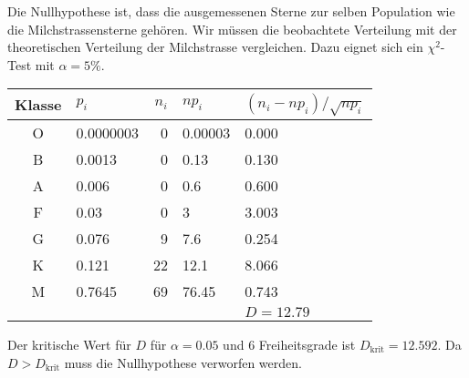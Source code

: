\begin{loesung}
Die Nullhypothese ist, dass die ausgemessenen Sterne zur selben
Population wie die Milchstrassensterne gehören.
Wir müssen die beobachtete Verteilung mit der theoretischen Verteilung
der Milchstrasse vergleichen.
Dazu eignet sich ein $\chi^2$-Test mit $\alpha=5\%$.
\begin{center}
\begin{tabular}{|c|l|r|l|l|}
\hline
Klasse&$p_i$    &$n_i$&$np_i$            &$(n_i-np_i)/\sqrt{np_i}$\\
\hline
   O  &0.0000003&    0&\phantom{0}0.00003& 0.000\phantom{03003603}\\
   B  &0.0013   &    0&\phantom{0}0.13   & 0.130\phantom{1561    }\\
   A  &0.006    &    0&\phantom{0}0.6    & 0.600\phantom{7207    }\\
   F  &0.03     &    0&\phantom{0}3      & 3.003\phantom{603     }\\
   G  &0.076    &    9&\phantom{0}7.6    & 0.254\phantom{2371    }\\
   K  &0.121    &   22&12.1              & 8.066\phantom{546     }\\
   M  &0.7645   &   69&76.45             & 0.743\phantom{1121    }\\
\hline
      &         &     &                  &$D=12.79$\\
\hline
\end{tabular}
\end{center}
Der kritische Wert für $D$ für $\alpha = 0.05$ und $6$ Freiheitsgrade
ist $D_{\text{krit}}=12.592$. 
Da $D>D_{\text{krit}}$ muss die Nullhypothese verworfen werden.
\end{loesung}

